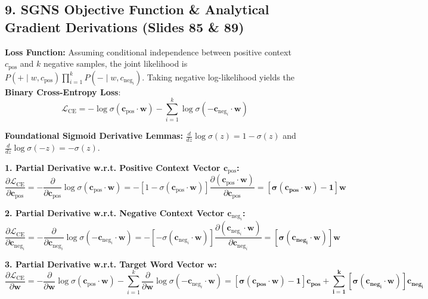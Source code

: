 \documentclass[10pt,a4paper]{article}
\begin{document}
\vspace{1pt}
\subsection*{\color{themeblue} 9. SGNS Objective Function \& Analytical Gradient Derivations (Slides 85 \& 89)}
\vspace{-2pt}

\begin{examplebox}
\footnotesize
\textbf{Loss Function:} Assuming conditional independence between positive context $c_{\text{pos}}$ and $k$ negative samples, the joint likelihood is $P(+ \mid w, c_{\text{pos}}) \prod_{i=1}^k P(- \mid w, c_{\text{neg}_i})$. Taking negative log-likelihood yields the \textbf{Binary Cross-Entropy Loss}:
\begin{equation}
    \mathcal{L}_{\text{CE}} = - \log \sigma(\mathbf{c}_{\text{pos}} \cdot \mathbf{w}) - \sum_{i=1}^k \log \sigma(-\mathbf{c}_{\text{neg}_i} \cdot \mathbf{w})
\end{equation}

\textbf{Foundational Sigmoid Derivative Lemmas:}
$\frac{d}{dz}\log \sigma(z) = 1 - \sigma(z)$ \quad and \quad $\frac{d}{dz}\log \sigma(-z) = -\sigma(z)$.

\noindent\textbf{1. Partial Derivative w.r.t. Positive Context Vector $\mathbf{c}_{\text{pos}}$:}
\begin{equation}
    \frac{\partial \mathcal{L}_{\text{CE}}}{\partial \mathbf{c}_{\text{pos}}} = -\frac{\partial}{\partial \mathbf{c}_{\text{pos}}} \log \sigma(\mathbf{c}_{\text{pos}} \cdot \mathbf{w}) = - [1 - \sigma(\mathbf{c}_{\text{pos}} \cdot \mathbf{w})] \frac{\partial (\mathbf{c}_{\text{pos}} \cdot \mathbf{w})}{\partial \mathbf{c}_{\text{pos}}} = \mathbf{[\sigma(\mathbf{c}_{\text{pos}} \cdot \mathbf{w}) - 1]\mathbf{w}}
\end{equation}

\noindent\textbf{2. Partial Derivative w.r.t. Negative Context Vector $\mathbf{c}_{\text{neg}_i}$:}
\begin{equation}
    \frac{\partial \mathcal{L}_{\text{CE}}}{\partial \mathbf{c}_{\text{neg}_i}} = -\frac{\partial}{\partial \mathbf{c}_{\text{neg}_i}} \log \sigma(-\mathbf{c}_{\text{neg}_i} \cdot \mathbf{w}) = - [-\sigma(\mathbf{c}_{\text{neg}_i} \cdot \mathbf{w})] \frac{\partial (\mathbf{c}_{\text{neg}_i} \cdot \mathbf{w})}{\partial \mathbf{c}_{\text{neg}_i}} = \mathbf{[\sigma(\mathbf{c}_{\text{neg}_i} \cdot \mathbf{w})]\mathbf{w}}
\end{equation}

\noindent\textbf{3. Partial Derivative w.r.t. Target Word Vector $\mathbf{w}$:}
\begin{equation}
    \frac{\partial \mathcal{L}_{\text{CE}}}{\partial \mathbf{w}} = -\frac{\partial}{\partial \mathbf{w}} \log \sigma(\mathbf{c}_{\text{pos}} \cdot \mathbf{w}) - \sum_{i=1}^k \frac{\partial}{\partial \mathbf{w}} \log \sigma(-\mathbf{c}_{\text{neg}_i} \cdot \mathbf{w}) = \mathbf{[\sigma(\mathbf{c}_{\text{pos}} \cdot \mathbf{w}) - 1]\mathbf{c}_{\text{pos}} + \sum_{i=1}^k [\sigma(\mathbf{c}_{\text{neg}_i} \cdot \mathbf{w})]\mathbf{c}_{\text{neg}_i}}
\end{equation}
\end{examplebox}
\end{document}
